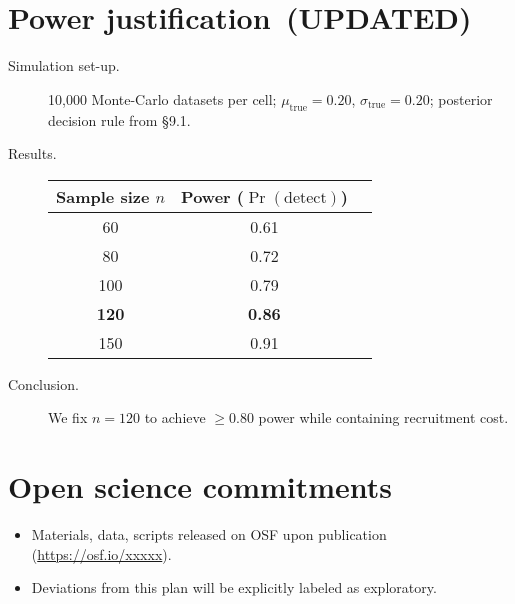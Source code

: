 \documentclass[12pt]{article}
\begin{document}
\section{Power justification \,(UPDATED)}

\begin{description}
\item[Simulation set-up.]  
10,000 Monte-Carlo datasets per cell; \(\mu_{\text{true}}=0.20\), \(\sigma_{\text{true}}=0.20\);
posterior decision rule from §9.1.

\item[Results.]  

\begin{center}
\begin{tabular}{@{}ccc@{}}
\toprule
Sample size $n$ & Power (\(\Pr(\text{detect})\)) \\
\midrule
60  & 0.61\\
80  & 0.72\\
100 & 0.79\\
\textbf{120} & \textbf{0.86}\\
150 & 0.91\\
\bottomrule
\end{tabular}
\end{center}

\item[Conclusion.]  
We fix \(n=120\) to achieve \(\ge 0.80\) power while containing recruitment cost.
\end{description}

\section{Open science commitments}
\begin{itemize}
\item Materials, data, scripts released on OSF upon publication (\url{https://osf.io/xxxxx}).
\item Deviations from this plan will be explicitly labeled as exploratory.
\end{itemize}
\end{document}

